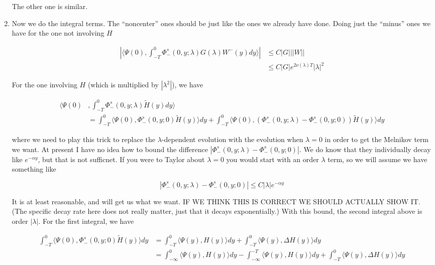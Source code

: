 \documentclass[12pt]{article}
\begin{document}
\begin{enumerate}
The other one is similar.

\item Now we do the integral terms. The ``noncenter'' ones should be just like the ones we already have done. Doing just the ``minus'' ones we have for the one not involving $H$

\begin{align*}
\left| \langle \Psi(0), \int_{-T}^0 \Phi^s_-(0, y; \lambda) G(\lambda)W^-(y) dy \rangle \right|
&\leq C |G| ||W|| \\
&\leq C |G| e^{2 \nu(\lambda)T}|\lambda|^2 
\end{align*}

For the one involving $H$ (which is multiplied by $|\lambda^2|$), we have

\begin{align*}
\langle \Psi(0)&, \int_{-T}^0 \Phi^s_-(0, y; \lambda) \tilde{H}(y) dy \rangle \\ 
&= \int_{-T}^0 \langle \Psi(0), \Phi^s_-(0, y; 0) \tilde{H}(y) \rangle dy + 
\int_{-T}^0 \langle \Psi(0), (\Phi^s_-(0, y; \lambda) - \Phi^s_-(0, y; 0)) \tilde{H}(y) \rangle dy
\end{align*}

where we need to play this trick to replace the $\lambda$-dependent evolution with the evolution when $\lambda = 0$ in order to get the Melnikov term we want. At present I have no idea how to bound the difference $|\Phi^s_-(0, y; \lambda) - \Phi^s_-(0, y; 0)|$. We do know that they individually decay like $e^{-\alpha y}$, but that is not sufficnet. If you were to Taylor about $\lambda = 0$ you would start with an order $\lambda$ term, so we will assume we have something like

\[
|\Phi^s_-(0, y; \lambda) - \Phi^s_-(0, y; 0)| \leq C |\lambda| e^{-\alpha y}
\]

It is at least reasonable, and will get us what we want. IF WE THINK THIS IS CORRECT WE SHOULD ACTUALLY SHOW IT. (The specific decay rate here does not really matter, just that it decays exponentially.) With this bound, the second integral above is order $|\lambda|$. For the first integral, we have 

\begin{align*}
\int_{-T}^0 \langle \Psi(0), \Phi^s_-(0, y; 0) \tilde{H}(y) \rangle dy &= 
\int_{-T}^0 \langle \Psi(y), H(y) \rangle dy + \int_{-T}^0 \langle \Psi(y), \Delta H(y) \rangle dy \\
&= \int_{-\infty}^0 \langle \Psi(y), H(y) \rangle dy - \int_{-\infty}^{-T} \langle \Psi(y), H(y) \rangle dy + \int_{-T}^0 \langle \Psi(y), \Delta H(y) \rangle dy 
\end{align*}


\end{enumerate}
\end{document}
